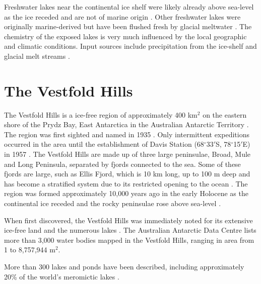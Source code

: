 Freshwater lakes near the continental ice shelf were likely already above sea-level as the ice receded and are not of marine origin \cite{Bronge1996}. %
Other freshwater lakes were originally marine-derived but have been flushed fresh by glacial meltwater \cite{Pickard1986}.
The chemistry of the exposed lakes is very much influenced by the local geographic and climatic conditions.
Input sources include precipitation from the ice-shelf and glacial melt streams \cite{Burton1981}. 


\section{The Vestfold Hills}
The Vestfold Hills  is a ice-free region of approximately 400 km$^2$ on the eastern shore of the Prydz Bay, East Antarctica in the Australian Antarctic Territory \cite{Gibson1999}.
The region was first sighted and named in 1935 \cite{Law1959}.
Only intermittent expeditions occurred in the area until the establishment of Davis Station (68$^{\circ}$33$'$S, 78$^{\circ}$15$'$E) in 1957 \cite{Law1959}. 
The Vestfold Hills are made up of three large peninsulae, Broad, Mule and Long Peninsula, separated by fjords connected to the sea.
Some of these fjords are large, such as Ellis Fjord, which is 10 km long, up to 100 m deep and has become a stratified system due to its restricted opening to the ocean \cite{Burke1988}.
The region was formed approximately 10,000 years ago in the early Holocene as the continental ice receded and the rocky peninsulae rose above sea-level \cite{Zwartz1998}. 

When first discovered, the Vestfold Hills was immediately noted for its extensive ice-free land and the numerous lakes \cite{Johnstone1973}.
The Australian Antarctic Data Centre lists more than 3,000 water bodies mapped in the Vestfold Hills, ranging in area from 1 to 8,757,944 m$^2$. %

More than 300 lakes and ponds have been described, including approximately 20\% of the world's meromictic lakes \cite{Gibson1999}. %


